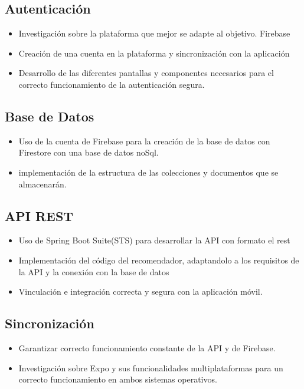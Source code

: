 \subsection{Autenticación}
\begin{itemize}
    \item Investigación sobre la plataforma que mejor se adapte al objetivo. Firebase
    \item Creación de una cuenta en la plataforma y sincronización con la aplicación
    \item Desarrollo de las diferentes pantallas y componentes necesarios para el correcto funcionamiento de la autenticación segura.
\end{itemize}

\subsection{Base de Datos}
\begin{itemize}
    \item Uso de la cuenta de Firebase para la creación de la base de datos con Firestore con una base de datos noSql.
    \item implementación de la estructura de las colecciones y documentos que se almacenarán.
\end{itemize}

\subsection{API REST}
\begin{itemize}
    \item Uso de Spring Boot Suite(STS) para desarrollar la API con formato el rest
    \item Implementación del código del recomendador, adaptandolo a los requisitos de la API y la conexión con la base de datos
    \item Vinculación e integración correcta y segura con la aplicación móvil.
\end{itemize}

\subsection{Sincronización}
\begin{itemize}
    \item Garantizar correcto funcionamiento constante de la API y de Firebase.
    \item Investigación sobre Expo y sus funcionalidades multiplataformas para un correcto funcionamiento en ambos sistemas operativos.
\end{itemize}

